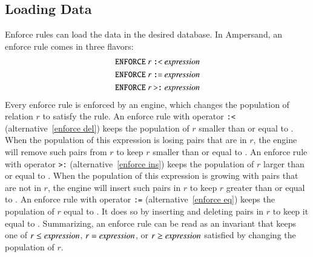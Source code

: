 \documentclass{elsarticle}
\begin{document}
\subsection{Loading Data}
   Enforce rules can load the data in the desired database.
   In Ampersand, an enforce rule comes in three flavors:
\begin{eqnarray}
   \text{\tt ENFORCE}\ r\ \text{\tt :<}\ \id{expression}\label{enforce del}\\
   \text{\tt ENFORCE}\ r\ \text{\tt :=}\ \id{expression}\label{enforce eq}\\
   \text{\tt ENFORCE}\ r\ \text{\tt >:}\ \id{expression}\label{enforce ins}
\end{eqnarray}
   Every enforce rule is enforced by an engine,
   which changes the population of relation $r$ to satisfy the rule.
   An enforce rule with operator {\tt :<} (alternative~\ref{enforce del}) keeps the population of $r$ smaller than or equal to .
   When the population of this expression is losing pairs that are in $r$, the engine will remove such pairs from $r$ to keep $r$ smaller than or equal to .
   An enforce rule with operator {\tt >:} (alternative~\ref{enforce ins}) keeps the population of $r$ larger than or equal to .
   When the population of this expression is growing with pairs that are not in $r$, the engine will insert such pairs in $r$ to keep $r$ greater than or equal to .
   An enforce rule with operator {\tt :=} (alternative~\ref{enforce eq}) keeps the population of $r$ equal to .
   It does so by inserting and deleting pairs in $r$ to keep it equal to .
   Summarizing, an enforce rule can be read as an invariant that keeps one of $r\leq\text{\it expression\/}$, $r=\text{\it expression\/}$, or $r\geq\text{\it expression\/}$ satisfied by changing the population of $r$.
\end{document}
